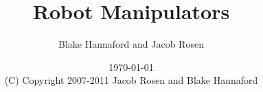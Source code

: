 \documentclass[oneside]{book}
\begin{document}
\setpagewiselinenumbers
\modulolinenumbers[5]

\setcounter{chapter}{0}


 \title{Robot Manipulators}

 \author{Blake Hannaford and Jacob Rosen}

 \date{\today\\(C) Copyright 2007-2011 Jacob Rosen and Blake Hannaford}

 \maketitle

\tableofcontents

\mainmatter

\linenumbers
%
%
%
%


%
%
% 
% 
%  
% 
% 
% 

 \appendix



%
\label{LastPage}
\end{document}
